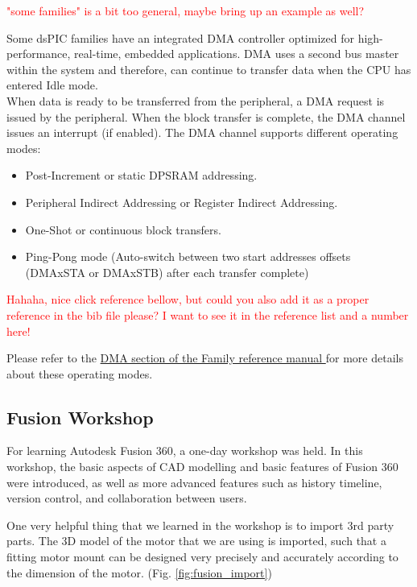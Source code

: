 \textcolor{red}{"some families" is a bit too general, maybe bring up an example as well?}

\vskip 0.2in
\noindent
Some dsPIC families have an integrated DMA controller optimized for high-performance, real-time, embedded applications. DMA uses a second bus master within the system and therefore, can continue to transfer data when the CPU has entered Idle mode.\\
When data is ready to be transferred from the peripheral, a DMA request is issued by the peripheral. When the block transfer is complete, the DMA channel issues an interrupt (if enabled).
\vskip 0.2in
\noindent
The DMA channel supports different operating modes:
\begin{itemize}
    \item Post-Increment or static DPSRAM addressing.
    \item Peripheral Indirect Addressing or Register Indirect Addressing.
    \item One-Shot or continuous block transfers.
    \item Ping-Pong mode (Auto-switch between two start addresses offsets (DMAxSTA or DMAxSTB) after each transfer complete)
\end{itemize}

\textcolor{red}{Hahaha, nice click reference bellow, but could you also add it as a proper reference in the bib file please? I want to see it in the reference list and a number here!}

Please refer to the \href{http://ww1.microchip.com/downloads/en/devicedoc/70215c.pdf}{DMA section of the Family reference manual }for more details about these operating modes.


\subsection{Fusion Workshop}
For learning Autodesk Fusion 360, a one-day workshop was held. In this workshop, the basic aspects of CAD modelling and basic features of Fusion 360 were introduced, as well as more advanced features such as history timeline, version control, and collaboration between users.

One very helpful thing that we learned in the workshop is to import 3rd party parts. The 3D model of the motor that we are using is imported, such that a fitting motor mount can be designed very precisely and accurately according to the dimension of the motor. (Fig. \ref{fig:fusion_import})

